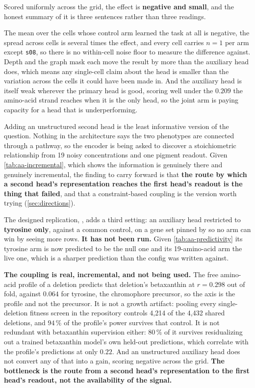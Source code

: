 Scored uniformly across the grid, the effect is \textbf{negative and small}, and the
honest summary of it is three sentences rather than three readings.

The mean over the cells whose control arm learned the task at all is negative, the spread
across cells is several times the effect, and every cell carries $n = 1$ per arm except
\texttt{s08}, so there is no within-cell noise floor to measure the difference against.
Depth and the graph mask each move the result by more than the auxiliary head does, which
means any single-cell claim about the head is smaller than the variation across the cells it
could have been made in. And the auxiliary head is itself weak wherever the primary head is
good, scoring well under the $0.209$ the amino-acid strand reaches when it is the only head,
so the joint arm is paying capacity for a head that is underperforming.

 Adding an unstructured second
head is the least informative version of the question. Nothing in the architecture says the
two phenotypes are connected through a pathway, so the encoder is being asked to discover a
stoichiometric relationship from 19 noisy concentrations and one pigment readout. Given
\cref{tab:aa-incremental}, which shows the information is genuinely there and genuinely
incremental, the finding to carry forward is that \textbf{the route by which a second head's
representation reaches the first head's readout is the thing that failed}, and that a
constraint-based coupling is the version worth trying (\cref{sec:directions}).

The designed replication,
, adds a third
setting: an auxiliary head restricted to \textbf{tyrosine only}, against a common control,
on a gene set pinned by  so no arm can win by seeing more rows.
\textbf{It has not been run.} Given \cref{tab:aa-predictivity} its tyrosine arm is now
predicted to be the null one and its 19-amino-acid arm the live one, which is a sharper
prediction than the config was written against.

\begin{keybox}
\textbf{The coupling is real, incremental, and not being used.} The free amino-acid profile
of a deletion predicts that deletion's betaxanthin at $r = 0.298$ out of fold, against
$0.064$ for tyrosine, the chromophore precursor, so the axis is the profile and not the
precursor. It is not a growth artifact: pooling every single-deletion fitness screen in the
repository controls 4,214 of the 4,432 shared deletions, and $94\,\%$ of the profile's power
survives that control. It is not redundant with betaxanthin supervision either: $80\,\%$ of
it survives residualizing out a trained betaxanthin model's own held-out predictions, which
correlate with the profile's predictions at only $0.22$. And an unstructured auxiliary head
does not convert any of that into a gain, scoring negative across the grid. \textbf{The
bottleneck is the route from a second head's representation to the first head's readout, not
the availability of the signal.}
\end{keybox}

